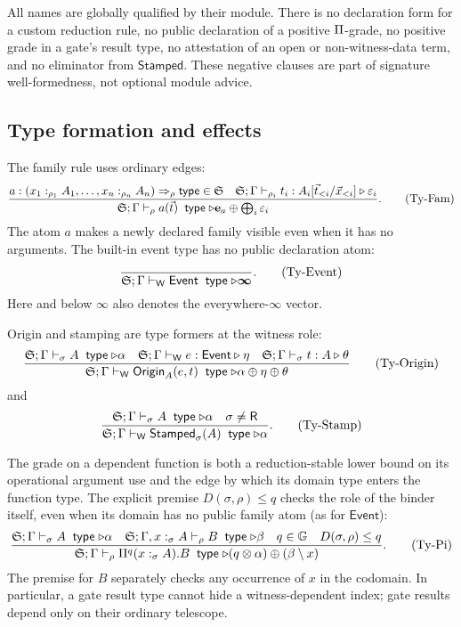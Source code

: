 \documentclass[11pt]{article}
\numberwithin{equation}{section}
\theoremstyle{definition}
\theoremstyle{plain}
\theoremstyle{remark}
\newcommand{\Type}{\mathsf{type}}
\newcommand{\Event}{\mathsf{Event}}
\newcommand{\Origin}{\mathsf{Origin}}
\newcommand{\Stamped}{\mathsf{Stamped}}
\newcommand{\Wit}{\mathsf W}
\newcommand{\Ren}{\mathsf R}
\newcommand{\Gd}{\mathbb G}
\newcommand{\eps}{\varepsilon}
\newcommand{\unit}{\mathbf e}
\newcommand{\absent}{\boldsymbol\infty}
\newcommand{\jtype}{\mathrel{\mathsf{type}}}
\begin{document}
All names are globally qualified by their module.  There is no declaration
form for a custom reduction rule, no public declaration of a positive
\(\Pi\)-grade, no positive grade in a gate's result type, no attestation of
an open or non-witness-data term, and no eliminator from \(\Stamped\).  These
negative clauses are part of signature
well-formedness, not optional module advice.

\subsection{Type formation and effects}\label{sec:type-rules}

The family rule uses ordinary edges:
\[
\frac{
 a:(x_1:_{\rho_1}A_1,\ldots,x_n:_{\rho_n}A_n)\Rightarrow_{\rho}\Type\in\AFDeclSignature
 \quad
 \AFDeclSignature;\Gamma\vdash_{\rho_i} t_i:A_i[\vec t_{<i}/\vec x_{<i}]
 \triangleright\eps_i
}{
 \AFDeclSignature;\Gamma\vdash_{\rho} a(\vec t)\;\jtype
 \triangleright
 \unit_a\oplus\bigoplus_i\eps_i
}.
\tag{Ty-Fam}
\]
The atom \(a\) makes a newly declared family visible even when it has no
arguments.  The built-in event type has no public declaration atom:
\[
\frac{}{\AFDeclSignature;\Gamma\vdash_{\Wit}\Event\;\jtype
\triangleright\absent}.
\tag{Ty-Event}
\]
Here and below \(\absent\) also denotes the everywhere-\(\absent\) vector.

Origin and stamping are type formers at the witness role:
\[
\frac{
 \AFDeclSignature;\Gamma\vdash_{\sigma} A\;\jtype\triangleright\alpha
 \quad
 \AFDeclSignature;\Gamma\vdash_{\Wit} e:\Event\triangleright\eta
 \quad
 \AFDeclSignature;\Gamma\vdash_{\sigma} t:A\triangleright\theta
}{
 \AFDeclSignature;\Gamma\vdash_{\Wit}\Origin_A(e,t)\;\jtype
 \triangleright\alpha\oplus\eta\oplus\theta
}
\tag{Ty-Origin}
\]
and
\[
\frac{
 \AFDeclSignature;\Gamma\vdash_{\sigma} A\;\jtype\triangleright\alpha
 \quad \sigma\ne\Ren
}{
 \AFDeclSignature;\Gamma\vdash_{\Wit}\Stamped_\sigma(A)\;\jtype
 \triangleright\alpha
}.
\tag{Ty-Stamp}
\]

The grade on a dependent function is both a reduction-stable lower bound on
its operational argument use and the edge by which its domain type enters the
function type.  The explicit premise \(D(\sigma,\rho)\le q\) checks the role
of the binder itself, even when its domain has no public family atom (as for
\(\Event\)):
\[
\frac{
 \AFDeclSignature;\Gamma\vdash_{\sigma} A\;\jtype\triangleright\alpha
 \quad
 \AFDeclSignature;\Gamma,x:_{\sigma}A\vdash_{\rho} B\;\jtype\triangleright\beta
 \quad q\in\Gd
 \quad D(\sigma,\rho)\le q
}{
 \AFDeclSignature;\Gamma\vdash_{\rho}\AFDepFun^q(x:_{\sigma}A).B\;\jtype
 \triangleright(q\otimes\alpha)\oplus(\beta\setminus x)
}.
\tag{Ty-Pi}
\]
The premise for \(B\) separately checks any occurrence of \(x\) in the
codomain.  In particular, a gate result type cannot hide a witness-dependent
index; gate results depend only on their ordinary telescope.
\end{document}
